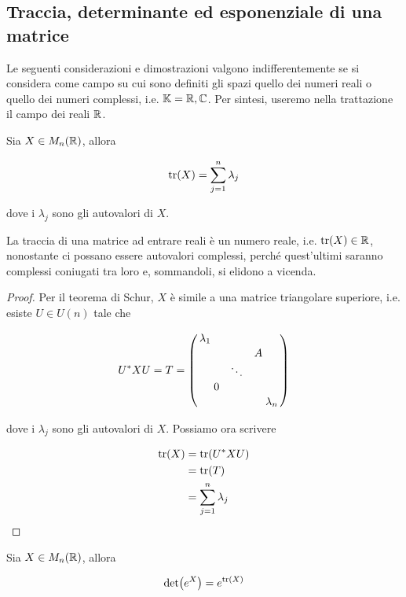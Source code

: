 \subsection{Traccia, determinante ed esponenziale di una matrice}

Le seguenti considerazioni e dimostrazioni valgono indifferentemente se si considera come campo su cui sono definiti gli spazi quello dei numeri reali o quello dei numeri complessi, i.e. $ \mathbb{K} = \mathbb{R},\mathbb{C} $. Per sintesi, useremo nella trattazione il campo dei reali $ \mathbb{R} $.

\begin{definition}
	Sia $ X \in M_{n}(\mathbb{R}) $, allora
	
	\begin{equation}
		\tr(X) = \sum_{j=1}^{n} \lambda_{j}
	\end{equation}
	
	dove i $ \lambda_{j} $ sono gli autovalori di $ X $.
\end{definition}

La traccia di una matrice ad entrare reali è un numero reale, i.e. $ \tr(X) \in \mathbb{R} $, nonostante ci possano essere autovalori complessi, perché quest'ultimi saranno complessi coniugati tra loro e, sommandoli, si elidono a vicenda.

\begin{proof}
	Per il teorema di Schur, $ X $ è simile a una matrice triangolare superiore, i.e. esiste $ U \in U(n) $ tale che
	
	\begin{equation}
		U^{*} X U = T = %
		\smqty(\dmat{ \lambda_{1}, %
						& & A \\ %
						& \ddots & \\ %
						0 & & , %
						\lambda_{n} })
	\end{equation}
	
	dove i $ \lambda_{j} $ sono gli autovalori di $ X $. Possiamo ora scrivere
	
	\begin{align}
		\begin{split}
			\tr(X) &= \tr(U^{*} X U)\\
			&= \tr(T)\\
			&= \sum_{j=1}^{n} \lambda_{j}
		\end{split}
	\end{align}
\end{proof}

\begin{definition}
	Sia $ X \in M_{n}(\mathbb{R}) $, allora
	
	\begin{equation}
		\det(e^{X}) = e^{\tr(X)}
	\end{equation}
\end{definition}

